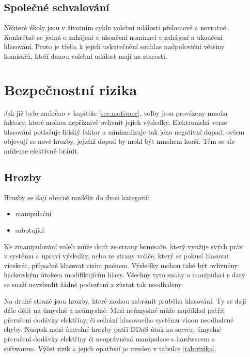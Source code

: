 \documentclass[11pt,twoside,a4paper]{book}
\begin{document}
\subsection{Společné schvalování} \label{sec:spolecne_schvalovani}

Některé úkoly jsou v životním cyklu volební události přelomové a nevratné. Konkrétně se jedná o zahájení a ukončení nominací a zahájení a ukončení hlasování. Proto je třeba k jejich uskutečnění souhlas nadpoloviční většiny komisařů, kteří danou volební událost mají na starosti.

\section{Bezpečnostní rizika} \label{sec:bezpecnostni_rizika}

Jak již bylo zmíněno v kapitole \ref{sec:motivace}, volby jsou provázeny mnoha faktory, které mohou nepříznivě ovlivnit jejich výsledky. Elektronická verze hlasování potlačuje lidský faktor a minimalizuje tak jeho negativní dopad, ovšem objevují se nové hrozby, jejichž dopad by mohl být mnohem horší. Těm se ale můžeme efektivně bránit.

\subsection{Hrozby} \label{sec:hrozby}

Hrozby\cite{book:prosser} se dají obecně rozdělit do dvou kategorií: 

\begin{itemize}
	\item manipulační
	\item sabotující
\end{itemize}	

Ke zmanipulování voleb může dojít ze strany komisaře, který využije svých práv v systému a upraví výsledky, nebo ze strany voliče, který se pokusí hlasovat vícekrát, případně hlasovat cizím jménem. Výsledky mohou také být ovlivněny hackerským útokem modifikujícím hlasy. Všechny tyto snahy o manipulaci s daty se snaží nevzbudit žádné podezření a zůstat tak neodhaleny. 

Na druhé straně jsou hrozby, které mohou zabránit průběhu hlasování. Ty se dají dále dělit na úmyslné a neúmyslné. Mezi neúmyslné může například patřit přerušení dodávky elektřiny, či selhání hlasovacího systému vinou neodhalené chyby. Naopak mezi úmyslné hrozby patří DDoS útok \cite{www:ddos} na server, úmyslné přerušení dodávky elektřiny či neoprávněná manipulace s hardwarem a softwarem. Výčet rizik a jejich opatření je uveden v tabulce \ref{tab:rizika}.
\end{document}
